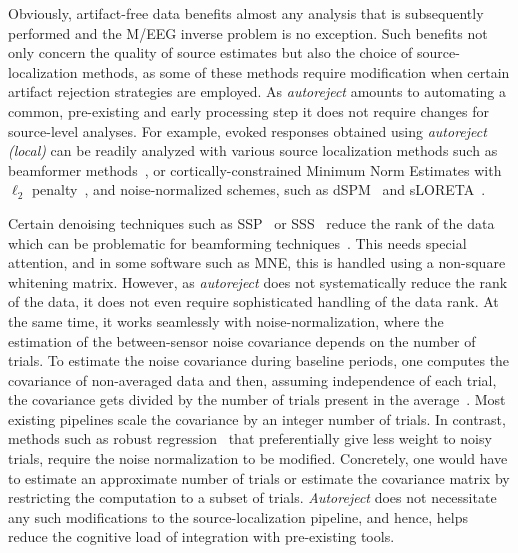 Obviously, artifact-free data benefits almost any analysis that is subsequently performed and the M/EEG inverse problem is no exception. Such benefits not only concern the quality of source estimates but also the choice of source-localization methods, as some of these methods require modification when certain artifact rejection strategies are employed.
As \emph{autoreject} amounts to automating a common, pre-existing and early processing step it does not require changes for source-level analyses. For example, evoked responses obtained using \emph{autoreject (local)} can be readily analyzed with various source localization methods such as beamformer methods~\citep{dalal2008five,gross2001dynamic}, or cortically-constrained Minimum Norm Estimates with $\ell_2$ penalty~\citep{uutela1999visualization}, and noise-normalized schemes, such as dSPM~\citep{dale2000dynamic} and sLORETA~\citep{pascual2002standardized}. 

Certain denoising techniques such as SSP~\citep{uusitalo1997signal} or SSS~\citep{taulu2004suppression} reduce the rank of the data which can be problematic for beamforming techniques~\citep{woolrich2011meg}. This needs special attention, and in some software such as MNE, this is handled using a non-square whitening matrix. However, as \emph{autoreject} does not systematically reduce the rank of the data, it does not even require sophisticated handling of the data rank. At the same time, it works seamlessly with noise-normalization, where the estimation of the between-sensor noise covariance depends on the number of trials. To estimate the noise covariance during baseline periods, one computes the covariance of non-averaged data and then, assuming independence of each trial, the covariance gets divided by the number of trials present in the average~\citep{engemann2015automated_new}. Most existing pipelines scale the covariance by an integer number of trials. In contrast, methods such as robust regression~\citep{diedrichsen2005detecting} that preferentially give less weight to noisy trials, require the noise normalization to be modified. Concretely, one would have to estimate an approximate number of trials or estimate the covariance matrix by restricting the computation to a subset of trials. \emph{Autoreject} does not necessitate any such modifications to the source-localization pipeline, and hence, helps reduce the cognitive load of integration with pre-existing tools.

